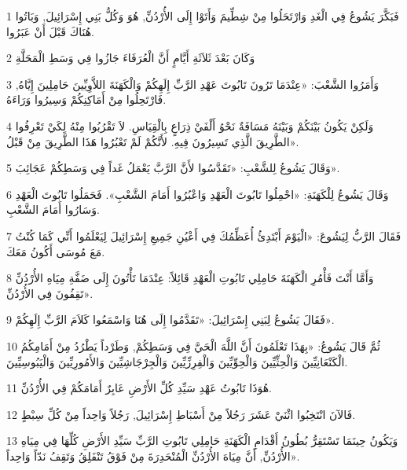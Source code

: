 \par 1 فَبَكَّرَ يَشُوعُ فِي الْغَدِ وَارْتَحَلُوا مِنْ شِطِّيمَ وَأَتَوْا إِلَى الأُرْدُنِّ, هُوَ وَكُلُّ بَنِي إِسْرَائِيلَ, وَبَاتُوا هُنَاكَ قَبْلَ أَنْ عَبَرُوا.
\par 2 وَكَانَ بَعْدَ ثَلاَثَةِ أَيَّامٍ أَنَّ الْعُرَفَاءَ جَازُوا فِي وَسَطِ الْمَحَلَّةِ
\par 3 وَأَمَرُوا الشَّعْبَ: «عِنْدَمَا تَرُونَ تَابُوتَ عَهْدِ الرَّبِّ إِلَهِكُمْ وَالْكَهَنَةَ اللاَّوِيِّينَ حَامِلِينَ إِيَّاهُ, فَارْتَحِلُوا مِنْ أَمَاكِنِكُمْ وَسِيرُوا وَرَاءَهُ.
\par 4 وَلَكِنْ يَكُونُ بَيْنَكُمْ وَبَيْنَهُ مَسَافَةٌ نَحْوُ أَلْفَيْ ذِرَاعٍ بِالْقِيَاسِ. لاَ تَقْرُبُوا مِنْهُ لِكَيْ تَعْرِفُوا الطَّرِيقَ الَّذِي تَسِيرُونَ فِيهِ. لأَنَّكُمْ لَمْ تَعْبُرُوا هَذَا الطَّرِيقَ مِنْ قَبْلُ».
\par 5 وَقَالَ يَشُوعُ لِلشَّعْبِ: «تَقَدَّسُوا لأَنَّ الرَّبَّ يَعْمَلُ غَداً فِي وَسَطِكُمْ عَجَائِبَ».
\par 6 وَقَالَ يَشُوعُ لِلْكَهَنَةِ: «احْمِلُوا تَابُوتَ الْعَهْدِ وَاعْبُرُوا أَمَامَ الشَّعْبِ». فَحَمَلُوا تَابُوتَ الْعَهْدِ وَسَارُوا أَمَامَ الشَّعْبِ.
\par 7 فَقَالَ الرَّبُّ لِيَشُوعَ: «الْيَوْمَ أَبْتَدِئُ أُعَظِّمُكَ فِي أَعْيُنِ جَمِيعِ إِسْرَائِيلَ لِيَعْلَمُوا أَنِّي كَمَا كُنْتُ مَعَ مُوسَى أَكُونُ مَعَكَ.
\par 8 وَأَمَّا أَنْتَ فَأْمُرِ الْكَهَنَةَ حَامِلِي تَابُوتِ الْعَهْدِ قَائِلاً: عِنْدَمَا تَأْتُونَ إِلَى ضَفَّةِ مِيَاهِ الأُرْدُنِّ تَقِفُونَ فِي الأُرْدُنِّ».
\par 9 فَقَالَ يَشُوعُ لِبَنِي إِسْرَائِيلَ: «تَقَدَّمُوا إِلَى هُنَا وَاسْمَعُوا كَلاَمَ الرَّبِّ إِلَهِكُمْ».
\par 10 ثُمَّ قَالَ يَشُوعُ: «بِهَذَا تَعْلَمُونَ أَنَّ اللَّهَ الْحَيَّ فِي وَسَطِكُمْ, وَطَرْداً يَطْرُدُ مِنْ أَمَامِكُمُ الْكَنْعَانِيِّينَ وَالْحِثِّيِّينَ وَالْحِوِّيِّينَ وَالْفِرِزِّيِّينَ وَالْجِرْجَاشِيِّينَ وَالأَمُورِيِّينَ وَالْيَبُوسِيِّينَ.
\par 11 هُوَذَا تَابُوتُ عَهْدِ سَيِّدِ كُلِّ الأَرْضِ عَابِرٌ أَمَامَكُمْ فِي الأُرْدُنِّ.
\par 12 فَالآنَ انْتَخِبُوا اثْنَيْ عَشَرَ رَجُلاً مِنْ أَسْبَاطِ إِسْرَائِيلَ, رَجُلاً وَاحِداً مِنْ كُلِّ سِبْطٍ.
\par 13 وَيَكُونُ حِينَمَا تَسْتَقِرُّ بُطُونُ أَقْدَامِ الْكَهَنَةِ حَامِلِي تَابُوتِ الرَّبِّ سَيِّدِ الأَرْضِ كُلِّهَا فِي مِيَاهِ الأُرْدُنِّ, أَنَّ مِيَاهَ الأُرْدُنِّ الْمُنْحَدِرَةَ مِنْ فَوْقُ تَنْفَلِقُ وَتَقِفُ نَدّاً وَاحِداً».
